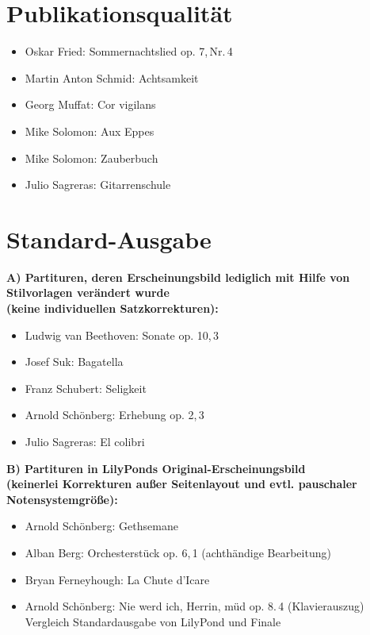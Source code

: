 \documentclass[DIV=12]{scrreprt}
\begin{document}
\pagebreak
\section*{Publikationsqualität}

\begin{itemize}
\item Oskar Fried: Sommernachtslied op. 7,\,Nr.\,4
\item Martin Anton Schmid: Achtsamkeit
\item Georg Muffat: Cor vigilans
\item Mike Solomon: Aux Eppes
\item Mike Solomon: Zauberbuch
\item Julio Sagreras: Gitarrenschule
\end{itemize}








\section*{Standard-Ausgabe}

\bigskip

\textbf{A) Partituren, deren Erscheinungsbild lediglich mit Hilfe von Stilvorlagen verändert wurde \\
(keine individuellen Satzkorrekturen):}

\begin{itemize}
\item Ludwig van Beethoven: Sonate op. 10,\,3
\item Josef Suk: Bagatella 
\item Franz Schubert: Seligkeit
\item Arnold Schönberg: Erhebung op. 2,\,3
\item Julio Sagreras: El colibri
\end{itemize}

\noindent\textbf{B) Partituren in LilyPonds Original-Erscheinungsbild \\
(keinerlei Korrekturen außer Seitenlayout und evtl. pauschaler Notensystemgröße):}

\begin{itemize}
\item Arnold Schönberg: Gethsemane
\item Alban Berg: Orchesterstück op. 6,\,1 (achthändige Bearbeitung)
\item Bryan Ferneyhough: La Chute d'Icare
\item Arnold Schönberg: Nie werd ich, Herrin, müd op. 8.\,4 (Klavierauszug)\\
Vergleich Standardausgabe von LilyPond und Finale
\end{itemize}
\end{document}
